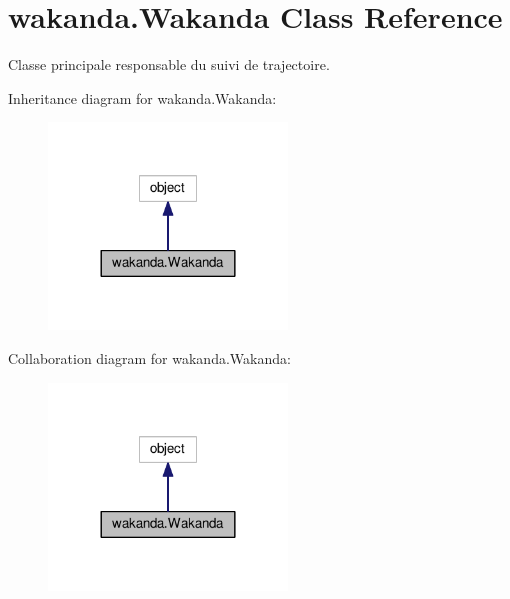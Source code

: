 \hypertarget{classwakanda_1_1Wakanda}{}\section{wakanda.\+Wakanda Class Reference}
\label{classwakanda_1_1Wakanda}


Classe principale responsable du suivi de trajectoire.  




Inheritance diagram for wakanda.\+Wakanda\+:\nopagebreak
\begin{figure}[H]
\begin{center}
\leavevmode
\includegraphics[width=180pt]{classwakanda_1_1Wakanda__inherit__graph}
\end{center}
\end{figure}


Collaboration diagram for wakanda.\+Wakanda\+:\nopagebreak
\begin{figure}[H]
\begin{center}
\leavevmode
\includegraphics[width=180pt]{classwakanda_1_1Wakanda__coll__graph}
\end{center}
\end{figure}
